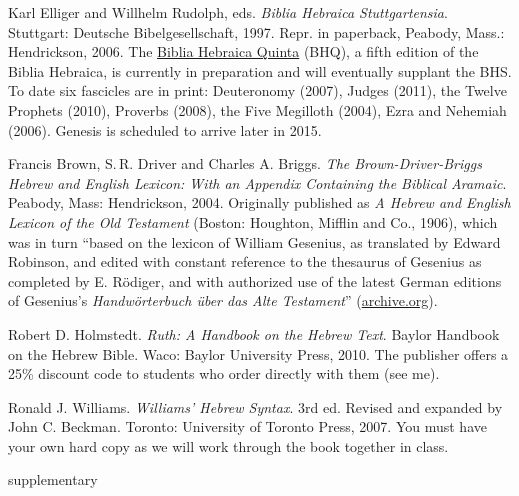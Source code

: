 \documentclass[titlepage]{article}
\begin{document}
\begingroup
\renewcommand{\section}[2]{}%
\begin{thebibliography}{Holm}%

	Karl Elliger and Willhelm Rudolph, eds. \emph{Biblia Hebraica
	Stuttgartensia}. Stutt\-gart: Deut\-sche Bi\-bel\-ge\-sell\-schaft,
	1997. Repr. in paperback, Peabody, Mass.: Hendrickson, 2006. The
	\href{http://www.academic-bible.com/en/home/current-projects/biblia-hebraica-quinta-bhq/}%
	{Biblia Hebraica Quinta} (BHQ), a fifth edition of the Biblia
	Hebraica, is currently in preparation and will eventually supplant
	the BHS. To date six fascicles are in print:
		Deuteronomy (2007),
		Judges (2011),
		the Twelve Prophets (2010),
		Proverbs (2008),
		the Five Megilloth (2004),
		Ezra and Nehemiah (2006).
		Genesis is scheduled to arrive later in 2015.

	Francis Brown, S.\,R. Driver and Charles A. Briggs. \emph{The
	Brown-Driver-Briggs Hebrew and English Lexicon: With an Appendix
	Containing the Biblical Aramaic}. Peabody, Mass: Hendrickson, 2004.
	Originally published as \emph{A Hebrew and English Lexicon of the
	Old Testament} (Boston: Houghton, Mifflin and Co., 1906), which was
	in turn ``based on the lexicon of William Gesenius, as translated by
	Edward Robinson, and edited with constant reference to the thesaurus
	of Gesenius as completed by E. Rödiger, and with authorized use of
	the latest German editions of Gesenius's \emph{Handwörterbuch über
	das Alte Testament}'' (\href{https://archive.org/details/hebrewenglishlex00geseuoft}{archive.org}).

	Robert D. Holmstedt. \emph{Ruth: A Handbook on the Hebrew Text}.
	Baylor Handbook on the Hebrew Bible. Waco: Baylor University Press,
	2010. The publisher offers a 25\% discount code to students who
	order directly with them (see me).

	Ronald J. Williams. \emph{Williams' Hebrew Syntax}. 3rd ed. Revised
	and expanded by John C. Beckman. Toronto: University of Toronto
	Press, 2007. You must have your own hard copy as we will work
	through the book together in class.

\end{thebibliography}
\endgroup

\section{Supplementary Texts}
\label{supplementary}
\end{document}
